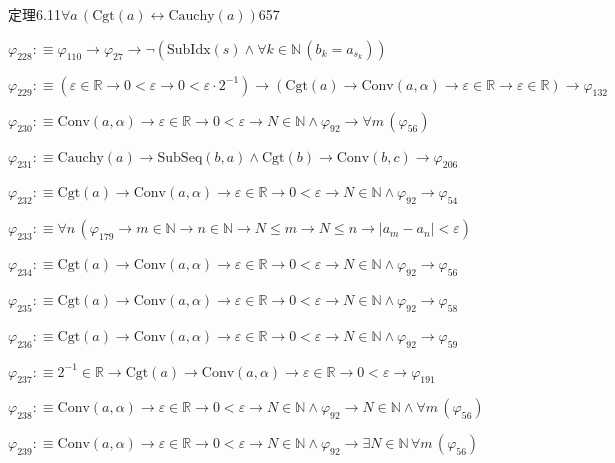 \begin{fullproof}{定理6.11}{$\forall a\,(\mathrm{Cgt}(a) \leftrightarrow \mathrm{Cauchy}(a))$}{657}
\begin{abbrevlist}
\item $\varphi_{228} :\equiv \varphi_{110} \to \varphi_{27} \to \neg (\mathrm{SubIdx}(s) \land \forall k \in \mathbb{N}\,(b_{k} = a_{s_{k}}))$
\item $\varphi_{229} :\equiv (\varepsilon \in \mathbb{R} \to 0 < \varepsilon \to 0 < \varepsilon \cdot 2^{-1}) \to (\mathrm{Cgt}(a) \to \mathrm{Conv}(a,\alpha) \to \varepsilon \in \mathbb{R} \to \varepsilon \in \mathbb{R}) \to \varphi_{132}$
\item $\varphi_{230} :\equiv \mathrm{Conv}(a,\alpha) \to \varepsilon \in \mathbb{R} \to 0 < \varepsilon \to N \in \mathbb{N} \land \varphi_{92} \to \forall m\,(\varphi_{56})$
\item $\varphi_{231} :\equiv \mathrm{Cauchy}(a) \to \mathrm{SubSeq}(b,a) \land \mathrm{Cgt}(b) \to \mathrm{Conv}(b,c) \to \varphi_{206}$
\item $\varphi_{232} :\equiv \mathrm{Cgt}(a) \to \mathrm{Conv}(a,\alpha) \to \varepsilon \in \mathbb{R} \to 0 < \varepsilon \to N \in \mathbb{N} \land \varphi_{92} \to \varphi_{54}$
\item $\varphi_{233} :\equiv \forall n\,(\varphi_{179} \to m \in \mathbb{N} \to n \in \mathbb{N} \to N \leq m \to N \leq n \to \lvert a_{m} - a_{n} \rvert < \varepsilon)$
\item $\varphi_{234} :\equiv \mathrm{Cgt}(a) \to \mathrm{Conv}(a,\alpha) \to \varepsilon \in \mathbb{R} \to 0 < \varepsilon \to N \in \mathbb{N} \land \varphi_{92} \to \varphi_{56}$
\item $\varphi_{235} :\equiv \mathrm{Cgt}(a) \to \mathrm{Conv}(a,\alpha) \to \varepsilon \in \mathbb{R} \to 0 < \varepsilon \to N \in \mathbb{N} \land \varphi_{92} \to \varphi_{58}$
\item $\varphi_{236} :\equiv \mathrm{Cgt}(a) \to \mathrm{Conv}(a,\alpha) \to \varepsilon \in \mathbb{R} \to 0 < \varepsilon \to N \in \mathbb{N} \land \varphi_{92} \to \varphi_{59}$
\item $\varphi_{237} :\equiv 2^{-1} \in \mathbb{R} \to \mathrm{Cgt}(a) \to \mathrm{Conv}(a,\alpha) \to \varepsilon \in \mathbb{R} \to 0 < \varepsilon \to \varphi_{191}$
\item $\varphi_{238} :\equiv \mathrm{Conv}(a,\alpha) \to \varepsilon \in \mathbb{R} \to 0 < \varepsilon \to N \in \mathbb{N} \land \varphi_{92} \to N \in \mathbb{N} \land \forall m\,(\varphi_{56})$
\item $\varphi_{239} :\equiv \mathrm{Conv}(a,\alpha) \to \varepsilon \in \mathbb{R} \to 0 < \varepsilon \to N \in \mathbb{N} \land \varphi_{92} \to \exists N \in \mathbb{N}\,\forall m\,(\varphi_{56})$

\end{abbrevlist}
\end{fullproof}
